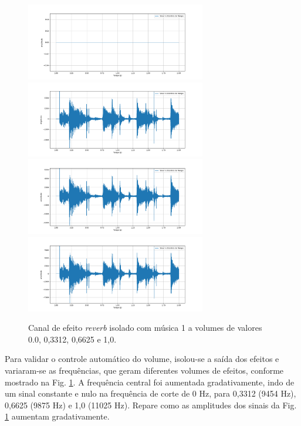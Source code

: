 \begin{figure}[h]
    \centering
    \includegraphics[width=0.7\textwidth]{figuras/fig66.png}
    \includegraphics[width=0.7\textwidth]{figuras/fig67.png}
    \includegraphics[width=0.7\textwidth]{figuras/fig68.png}
    \includegraphics[width=0.7\textwidth]{figuras/fig69.png}
    \caption{Canal de efeito \textit{reverb} isolado com música 1 a volumes de valores 0.0, 0,3312, 0,6625 e 1,0.}
    \label{fig66}
\end{figure}

Para validar o controle automático do volume, isolou-se a saída dos efeitos e variaram-se as frequências, que geram diferentes volumes de efeitos, %
conforme mostrado na Fig. \ref{fig66}.
A frequência central foi aumentada gradativamente, indo de um sinal constante e nulo na frequência de corte de 0 Hz, para 0,3312 (9454 Hz), 0,6625 (9875 Hz) e 1,0 (11025 Hz). Repare como as amplitudes dos sinais da Fig. \ref{fig66} aumentam gradativamente.

